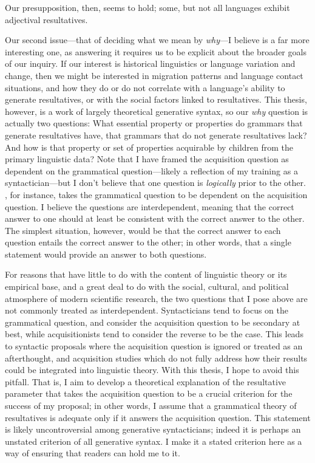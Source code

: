 \documentclass[MilwayThesis]{subfiles}
\begin{document}
Our presupposition, then, seems to hold; some, but not all languages exhibit adjectival resultatives.

Our second issue---that of deciding what we mean by \textit{why}---I believe is a far more interesting one, as answering it requires us to be explicit about the broader goals of our inquiry.
If our interest is historical linguistics or language variation and change, then we might be interested in migration patterns and language contact situations, and how they do or do not correlate with a language's ability to generate resultatives, or with the social factors linked to resultatives.
This thesis, however, is a work of largely theoretical generative syntax, so our \textit{why} question is actually two questions: What essential property or properties do grammars that generate resultatives have, that grammars that do not generate resultatives lack? And how is that property or set of properties acquirable by children from the primary linguistic data?
Note that I have framed the acquisition question as dependent on the grammatical question---likely a reflection of my training as a syntactician---but I don't believe that one question is \textit{logically} prior to the other.
\textcite{snyder1995language,snyder2001nature}, for instance, takes the grammatical question to be dependent on the acquisition question.
I believe the questions are interdependent, meaning that the correct answer to one should at least be consistent with the correct answer to the other.
The simplest situation, however, would be that the correct answer to each question entails the correct answer to the other; in other words, that a single statement would provide an answer to both questions.

For reasons that have little to do with the content of linguistic theory or its empirical base, and a great deal to do with the social, cultural, and political atmosphere of modern scientific research, the two questions that I pose above are not commonly treated as interdependent.
Syntacticians tend to focus on the grammatical question, and consider the acquisition question to be secondary at best, while acquisitionists tend to consider the reverse to be the case.
This leads to syntactic proposals where the acquisition question is ignored or treated as an afterthought, and acquisition studies which do not fully address how their results could be integrated into linguistic theory.
With this thesis, I hope to avoid this pitfall.
That is, I aim to develop a theoretical explanation of the resultative parameter that takes the acquisition question to be a crucial criterion for the success of my proposal; in other words, I assume that a grammatical theory of resultatives is adequate only if it answers the acquisition question.
This statement is likely uncontroversial among generative syntacticians; indeed it is perhaps an unstated criterion of all generative syntax.
I make it a stated criterion here as a way of ensuring that readers can hold me to it.
\end{document}
